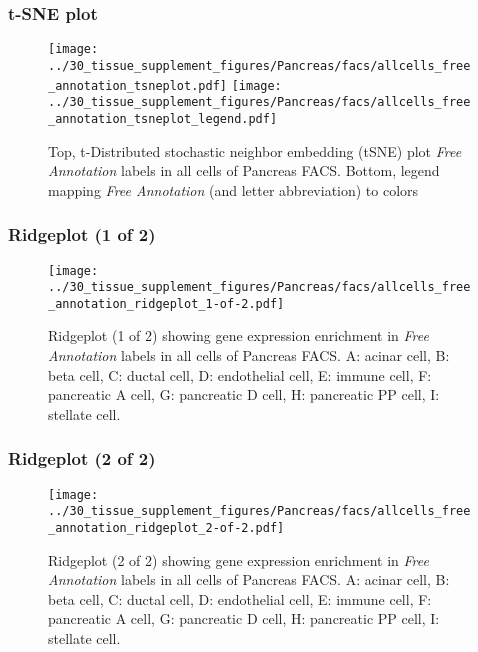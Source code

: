 \clearpage
\subsubsection{t-SNE plot}
\begin{figure}[h]
\centering
\texttt{[image: ../30\_tissue\_supplement\_figures/Pancreas/facs/allcells\_free\_annotation\_tsneplot.pdf]}
\texttt{[image: ../30\_tissue\_supplement\_figures/Pancreas/facs/allcells\_free\_annotation\_tsneplot\_legend.pdf]}
\caption{Top, t-Distributed stochastic neighbor embedding (tSNE) plot  \emph{Free Annotation} labels in all cells of Pancreas FACS. Bottom, legend mapping \emph{Free Annotation} (and letter abbreviation) to colors}
\end{figure}


\clearpage

\subsubsection{Ridgeplot (1 of 2)}
\begin{figure}[h]
\centering
\texttt{[image: ../30\_tissue\_supplement\_figures/Pancreas/facs/allcells\_free\_annotation\_ridgeplot\_1-of-2.pdf]}

\caption{ Ridgeplot (1 of 2)  showing gene expression enrichment in \emph{Free Annotation} labels in all cells of Pancreas FACS. A: acinar cell, B: beta cell, C: ductal cell, D: endothelial cell, E: immune cell, F: pancreatic A cell, G: pancreatic D cell, H: pancreatic PP cell, I: stellate cell.}
\end{figure}


\clearpage

\subsubsection{Ridgeplot (2 of 2)}
\begin{figure}[h]
\centering
\texttt{[image: ../30\_tissue\_supplement\_figures/Pancreas/facs/allcells\_free\_annotation\_ridgeplot\_2-of-2.pdf]}

\caption{ Ridgeplot (2 of 2)  showing gene expression enrichment in \emph{Free Annotation} labels in all cells of Pancreas FACS. A: acinar cell, B: beta cell, C: ductal cell, D: endothelial cell, E: immune cell, F: pancreatic A cell, G: pancreatic D cell, H: pancreatic PP cell, I: stellate cell.}
\end{figure}


\clearpage

